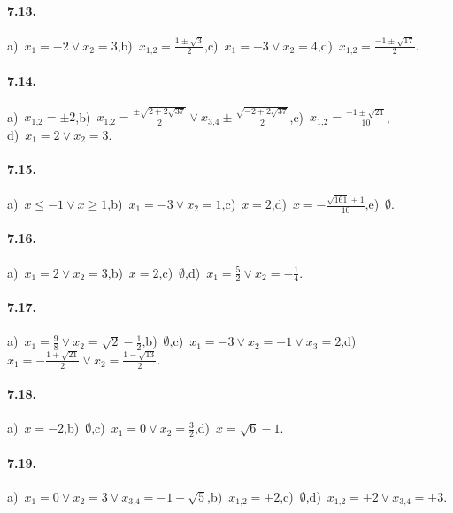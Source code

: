 \paragraph{7.13.} a)~$x_1=-2\vee x_2=3$,\quad b)~$x_{1\text{,}2}=\frac{1\pm \sqrt 3} 2$,\quad c)~$x_1=-3\vee x_2=4$,\quad d)~$x_{1\text{,}2}=\frac{-1\pm \sqrt{17}} 2$.

\paragraph{7.14.} a)~$x_{1\text{,}2}=\pm 2$,\quad b)~$x_{1\text{,}2}=\frac{\pm \sqrt{2+2\sqrt{37}}} 2\vee x_{3\text{,}4}\pm \frac{\sqrt{-2+2\sqrt{37}}} 2$,\quad c)~$x_{1\text{,}2}=\frac{-1\pm \sqrt{21}}{10}$,\protect\\
\quad d)~$x_1=2\vee x_2=3$.

\paragraph{7.15.} a)~$x\le -1\vee x\ge 1$,\quad b)~$x_1=-3\vee x_2=1$,\quad c)~$x=2$,\quad d)~$x=-\frac{\sqrt{161}+1}{10}$,\quad e)~$\emptyset $.

\paragraph{7.16.} a)~$x_1=2\vee x_2=3$,\quad b)~$x=2$,\quad c)~$\emptyset $,\quad d)~$x_1=\frac 5 2\vee x_2=-\frac 1 4$.

\paragraph{7.17.} a)~$x_1=\frac 9 8\vee x_2=\sqrt 2-\frac 1 2$,\quad b)~$\emptyset $,\quad c)~$x_1=-3\vee x_2=-1\vee x_3=2$,\quad d)~$x_1=-\frac{1+\sqrt{21}} 2\vee x_2=\frac{1-\sqrt{13}} 2$.

\paragraph{7.18.} a)~$x=-2$,\quad b)~$\emptyset $,\quad c)~$x_1=0\vee x_2=\frac 3 2$,\quad d)~$x=\sqrt 6-1$.

\paragraph{7.19.} a)~$x_1=0\vee x_2=3 \vee x_{3\text{,}4}=-1\pm \sqrt 5$,\quad b)~$x_{1\text{,}2}=\pm 2$,\quad c)~$\emptyset $,\quad d)~$x_{1\text{,}2}=\pm 2\vee x_{3\text{,}4}=\pm 3$.

